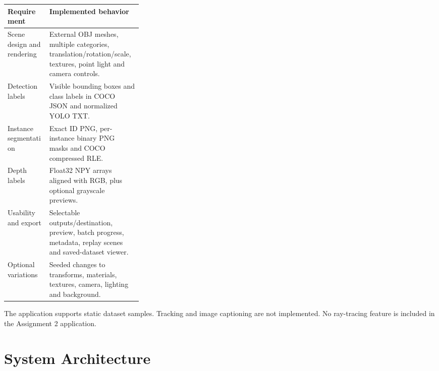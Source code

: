 \documentclass[12pt,a4paper]{article}
\begin{document}
\noindent\noindent\begin{tabularx}{\linewidth}{@{}p{0.31\linewidth}X@{}}
\toprule Requirement & Implemented behavior\\\midrule
Scene design and rendering & External OBJ meshes, multiple categories, translation/rotation/scale, textures, point light and camera controls.\\
Detection labels & Visible bounding boxes and class labels in COCO JSON and normalized YOLO TXT.\\
Instance segmentation & Exact ID PNG, per-instance binary PNG masks and COCO compressed RLE.\\
Depth labels & Float32 NPY arrays aligned with RGB, plus optional grayscale previews.\\
Usability and export & Selectable outputs/destination, preview, batch progress, metadata, replay scenes and saved-dataset viewer.\\
Optional variations & Seeded changes to transforms, materials, textures, camera, lighting and background.\\
\bottomrule
\end{tabularx}

The application supports static dataset samples. Tracking and image captioning are not implemented. No ray-tracing feature is included in the Assignment 2 application.

\section{System Architecture}
\end{document}

